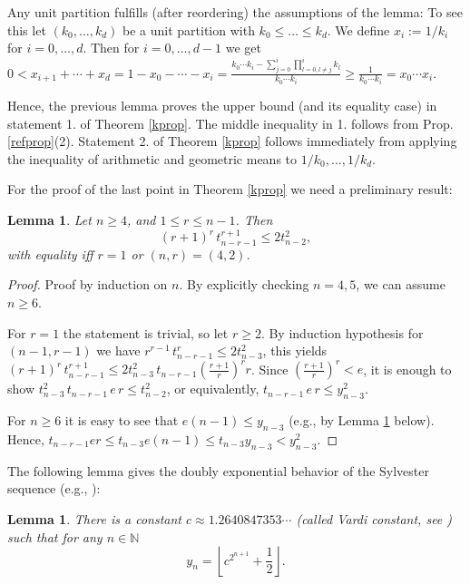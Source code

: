 \documentclass[a4paper,twoside]{article}
\def\N{{\mathbb N}}
\newtheorem{lemma}[theorem]{Lemma}
\begin{document}
Any unit partition fulfills (after reordering) the assumptions of the lemma: To see this let $(k_0, \ldots, k_d)$ be a unit partition with 
$k_0 \leq \ldots \leq k_d$. We define $x_i := 1/k_i$ for $i = 0, \ldots, d.$ 
Then for $i = 0, \ldots, d-1$ we get $0 < x_{i+1} + \cdots + x_d = 1 - x_0 - \cdots - x_i = 
\frac{k_0 \cdots k_i - \sum_{j=0}^i \prod_{l=0, l \not=j}^i k_l}{k_0 \cdots k_i} \geq \frac{1}{k_0 \cdots k_i} 
= x_0 \cdots x_i$.

\smallskip

Hence, the previous lemma proves the upper bound (and its equality case) in statement 1. of Theorem \ref{kprop}. 
The middle inequality in 1. follows from Prop. \ref{refprop}(2). Statement 2. of Theorem \ref{kprop} follows immediately from applying 
the inequality of arithmetic and geometric means to $1/k_0, \ldots, 1/k_d$. 

\smallskip

For the proof of the last point in Theorem \ref{kprop} we need a preliminary result:

\begin{lemma}
Let $n \geq 4$, and $1 \leq r \leq n-1$. Then
\[(r+1)^r \, t_{n-r-1}^{r+1} \leq 2 t_{n-2}^2,\]
with equality iff $r=1$ or $(n,r)=(4,2)$.
\label{cruc}
\end{lemma}

\begin{proof}

Proof by induction on $n$. By explicitly checking $n=4,5$, we can assume $n \geq 6$. 

For $r=1$ the statement is trivial, so let $r \geq 2$. 
By induction hypothesis for $(n-1,r-1)$ we have $r^{r-1} \, t_{n-r-1}^r \leq 2 t_{n-3}^2$, this yields 
$(r+1)^r \, t_{n-r-1}^{r+1} \leq 2 t_{n-3}^2 \, t_{n-r-1} (\frac{r+1}{r})^r r$. Since 
$(\frac{r+1}{r})^r < e$, it is enough to show $t_{n-3}^2 \, t_{n-r-1} \, e \, r \leq t_{n-2}^2$, 
or equivalently, $t_{n-r-1} \, e \, r \leq y_{n-3}^2$.

For $n \geq 6$ it is easy to see that $e (n-1) \leq y_{n-3}$ (e.g., by Lemma \ref{double} below). 
Hence, $t_{n-r-1} e r \leq t_{n-3} e (n-1) \leq t_{n-3} y_{n-3} < y_{n-3}^2$.

\end{proof}

The following lemma gives the 
doubly exponential behavior of the Sylvester sequence (e.g., \cite[(4.17)]{GKP89}):

\begin{lemma}
There is a constant $c \approx 1.2640847353\cdots$ (called {\em Vardi} constant, see 
\cite[A076393]{Slo04}) such that for any $n \in \N$
\[y_n = \left\lfloor c^{2^{n+1}} + \frac{1}{2} \right\rfloor.\]
\label{double}
\end{lemma}
\end{document}
